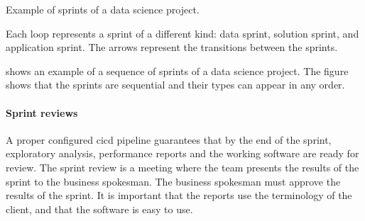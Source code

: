 \begin{figurebox}[label=fig:sprints]{Example of sprints of a data science project.}
  \centering
  \tcblower
  Each loop represents a sprint of a different kind: data sprint, solution sprint, and
  application sprint.  The arrows represent the transitions between the sprints.
\end{figurebox}

 shows an example of a sequence of sprints of a data science project.
The figure shows that the sprints are sequential and their types can appear in
any order.

\paragraph{Sprint reviews}

A proper configured \gls{cicd} pipeline guarantees that by the end of the sprint,
exploratory analysis, performance reports and the working software are ready for review.
The sprint review is a meeting where the team presents the results of the sprint to the
business spokesman.  The business spokesman must approve the results of the sprint.
It is important that the reports use the terminology of the client, and that the
software is easy to use.

